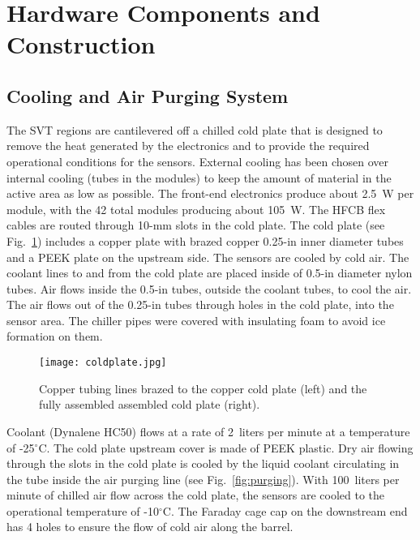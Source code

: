 \section{Hardware Components and Construction}

\subsection{Cooling and Air Purging System}

The SVT regions are cantilevered off a chilled cold plate that is designed to remove the heat generated by the
electronics and to provide the required operational conditions for the sensors. External cooling has been chosen
over internal cooling (tubes in the modules) to keep the amount of material in the active area as low as possible. The
front-end electronics produce about 2.5~W per module, with the 42 total modules producing about 105~W. The
HFCB flex cables are routed through 10-mm slots in the cold plate. The cold plate (see Fig.~\ref{fig:coldplate})
includes a copper plate with brazed  copper 0.25-in inner diameter tubes and a PEEK plate on the upstream side.
The sensors are cooled by cold air.  The coolant lines to and from the cold plate are placed inside of 0.5-in diameter
nylon tubes. Air flows inside the 0.5-in tubes, outside the coolant tubes, to cool the air. The air flows out of the
0.25-in tubes through holes in the cold plate, into the sensor area. The chiller pipes were covered with insulating
foam to avoid ice formation on them.

\begin{figure}[hbt] 
\centering 
\texttt{[image: coldplate.jpg]}
\caption{Copper tubing lines brazed to the copper cold plate (left) and the fully assembled assembled cold plate
  (right).}
\label{fig:coldplate}
\end{figure}


Coolant (Dynalene HC50) flows at a rate of 2~liters per minute at a temperature of -25$^\circ$C. The cold plate
upstream cover is made of PEEK plastic. Dry air flowing through the slots in the cold plate is cooled by the liquid
coolant circulating in the tube inside the air purging line (see Fig.~\ref{fig:purging}). With 100~liters per minute
of chilled air flow across the cold plate, the sensors are cooled to the operational temperature of -10$^\circ$C. The
Faraday cage cap on the downstream end has 4 holes to ensure the flow of cold air along the barrel. 

